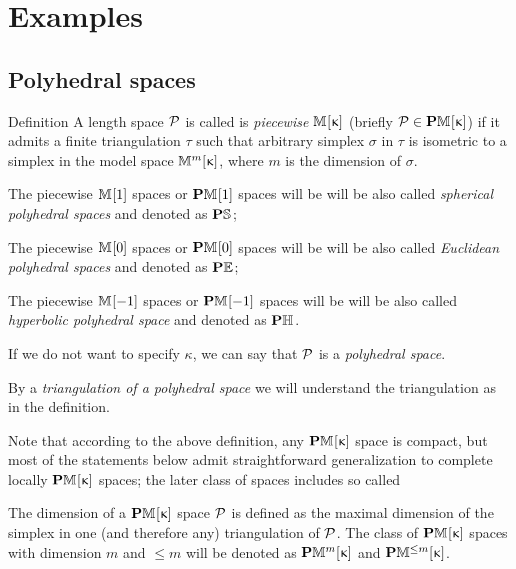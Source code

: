 \chapter{Examples}

\section{Polyhedral spaces}

\begin{thm}{Definition}\label{def:poly}
A length space $\mathcal{P}$ is called
is  \emph{piecewise $\mathbb{M}_{{}}^{}[{\upkappa}]$} (briefly $\spc{P}\in \PM{}\kappa$)
if it admits a finite triangulation $\tau$ 
such that arbitrary simplex $\sigma$ in $\tau$ is isometric to a simplex in the model space $\mathbb{M}_{{}}^{m}[{\upkappa}]$, 
where $m$ is the dimension of $\sigma$.

\begin{subthm}{}
The piecewise $\mathbb{M}_{{}}^{}[{1}]$ spaces or $\mathbf{P}\mathbb{M}_{{}}^{}[{1}]$ spaces will be 
will be also called 
\emph{spherical polyhedral spaces} and denoted as $\mathbf{P}\mathbb{S}_{{}}^{}$;
\end{subthm}

\begin{subthm}{}
The piecewise $\mathbb{M}_{{}}^{}[{0}]$ spaces or $\mathbf{P}\mathbb{M}_{{}}^{}[{0}]$ spaces will be 
will be also called 
\emph{Euclidean polyhedral spaces}
and denoted as $\mathbf{P}\mathbb{E}_{{}}^{}$;
\end{subthm}

\begin{subthm}{}
The piecewise $\mathbb{M}_{{}}^{}[{-1}]$ spaces or $\mathbf{P}\mathbb{M}_{{}}^{}[{-1}]$ spaces will be 
will be also called 
\emph{hyperbolic polyhedral space}
and denoted as $\mathbf{P}\mathbb{H}_{{}}^{}$.
\end{subthm}

If we do not want to specify $\kappa$, we can say that $\mathcal{P}$ is a \emph{polyhedral space}.

By a \emph{triangulation of a polyhedral space} we will understand the triangulation as in the definition. 

\end{thm}

Note that according to the above definition,
any $\mathbf{P}\mathbb{M}_{{}}^{}[{\upkappa}]$ space is compact,
but most of the statements below admit straightforward generalization to complete locally $\mathbf{P}\mathbb{M}_{{}}^{}[{\upkappa}]$ spaces;
the later class of spaces includes so called 


The dimension of a $\mathbf{P}\mathbb{M}_{{}}^{}[{\upkappa}]$ space $\mathcal{P}$
is defined as the maximal dimension of the simplex 
in one (and therefore any) triangulation of $\mathcal{P}$.
The class of $\mathbf{P}\mathbb{M}_{{}}^{}[{\upkappa}]$ spaces 
with dimension $m$ and $\le m$ will be denoted 
as $\mathbf{P}\mathbb{M}_{{}}^{m}[{\upkappa}]$ and $\PM{\le m}{\kappa}$.


